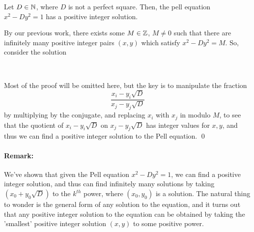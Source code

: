 \documentclass[../main.tex]{subfiles}
\begin{document}
\begin{thm}
    Let $D \in \mathbb{N}$, where $D$ is not a perfect square. Then, the pell equation $x^2-Dy^2=1$ has a positive integer solution.
\end{thm}
\begin{pf}
    By our previous work, there exists some $M \in \mathbb{Z}$, $M \neq 0$ such that there are infinitely many positive integer pairs $(x,y)$ which satisfy $x^2-Dy^2=M$. So, consider the solution 
    \begin{center}
         \\
    \end{center}
    Most of the proof will be omitted here, but the key is to manipulate the fraction $$\dfrac{x_i-y_i\sqrt{D}}{x_j-y_j\sqrt{D}}$$ by multiplying by the conjugate, and replacing $x_i$ with $x_j$ in modulo $M$, to see that the quotient of $x_i-y_i\sqrt{D}$ on $x_j-y_j\sqrt{D}$ has integer values for $x,y$, and thus we can find a positive integer solution to the Pell equation. \qed
\end{pf}
\paragraph{Remark:} We've shown that given the Pell equation $x^2-Dy^2=1$, we can find a positive integer solution, and thus can find infinitely many solutions by taking $(x_0+y_0\sqrt{D})$ to the $k^{th}$ power, where $(x_0,y_0)$ is a solution. The natural thing to wonder is the general form of any solution to the equation, and it turns out that any positive integer solution to the equation can be obtained by taking the 'smallest' positive integer solution $(x,y)$ to some positive power.
\end{document}
